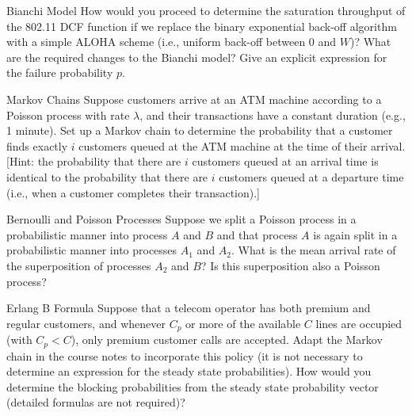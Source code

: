 \begin{problem}{Bianchi Model}
How would you proceed to determine the saturation throughput of
the 802.11 DCF function if we replace the binary exponential back-off algorithm with
a simple ALOHA scheme (i.e., uniform back-off between $0$ and $W$)? What are
the required changes to the Bianchi model? Give an explicit expression for the failure
probability $p$.
\end{problem}

\begin{problem}{Markov Chains}
Suppose customers arrive at an ATM machine according to a Poisson
process with rate $\lambda$, and their transactions have a constant duration (e.g., 1 minute).
Set up a Markov chain to determine the probability that a customer finds exactly $i$
customers queued at the ATM machine at the time of their arrival. [Hint: the probability
that there are $i$ customers queued at an arrival time is identical to the probability that
there are $i$ customers queued at a departure time (i.e., when a customer completes their
transaction).]
\end{problem}

\begin{problem}{Bernoulli and Poisson Processes}
Suppose we split a Poisson process in a probabilistic manner into process $A$ and $B$ and that process $A$ is again split in a probabilistic
manner into processes $A_1$ and $A_2$. What is the mean arrival rate of the superposition of
processes $A_2$ and $B$? Is this superposition also a Poisson process?
\end{problem}

\begin{problem}{Erlang B Formula}
Suppose that a telecom operator has both premium and regular
customers, and whenever $C_p$ or more of the available $C$ lines are occupied (with $C_p < C$),
only premium customer calls are accepted. Adapt the Markov chain in the course notes
to incorporate this policy (it is not necessary to determine an expression for the steady
state probabilities). How would you determine the blocking probabilities from the steady
state probability vector (detailed formulas are not required)?
\end{problem}